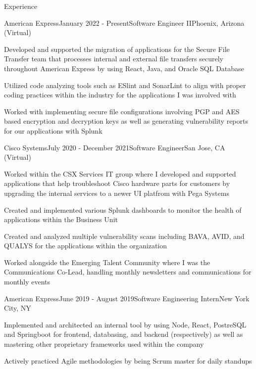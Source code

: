 \documentclass{resume} %
\begin{document}
\begin{rSection}{Experience}

\begin{rSubsection}{American Express}{January 2022 - Present}{Software Engineer II}{Phoenix, Arizona (Virtual)}
\item Developed and supported the migration of applications for the Secure File Transfer team that processes internal and external file transfers securely throughout American Express by using React, Java, and Oracle SQL Database 
\item Utilized code analyzing tools such as ESlint and SonarLint to align with proper coding practices within the industry for the applications I was involved with
\item Worked with implementing secure file configurations involving PGP and AES based encryption and decryption keys as well as generating vulnerability reports for our applications with Splunk
\end{rSubsection}

\begin{rSubsection}{Cisco Systems}{July 2020 - December 2021}{Software Engineer}{San Jose, CA (Virtual)}
\item Worked within the CSX Services IT group where I developed and supported applications that help troubleshoot Cisco hardware parts for customers by upgrading the internal services to a newer UI platfrom with Pega Systems
\item Created and implemented various Splunk dashboards to monitor the health of applications within the Business Unit
\item Created and analyzed multiple vulnerability scans including BAVA, AVID, and QUALYS for the applications within the organization
\item Worked alongside the Emerging Talent Community where I was the Communications Co-Lead, handling monthly newsletters and communications for monthly events
\end{rSubsection}

\begin{rSubsection}{American Express}{June 2019 - August 2019}{Software Engineering Intern}{New York City, NY}
\item Implemented and architected an internal tool by using Node, React, PostreSQL and Springboot for frontend, databasing, and backend (respectively) as well as mastering other proprietary frameworks used within the company
\item Actively practiced Agile methodologies by being Scrum master for daily standups
\end{rSubsection}



\end{rSection}
\end{document}
